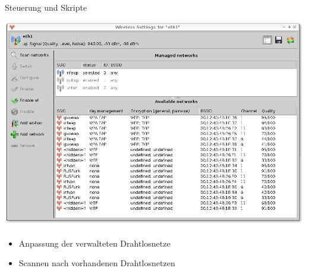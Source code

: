 \begin{frame}[<+-| alert@+>]{Steuerung und Skripte}

		\includegraphics[scale=0.25]{qnut_scan.png}

	\begin{itemize}
		\item Anpassung der verwalteten Drahtlosnetze
		\item Scannen nach vorhandenen Drahtlosnetzen
	\end{itemize}
\end{frame}

